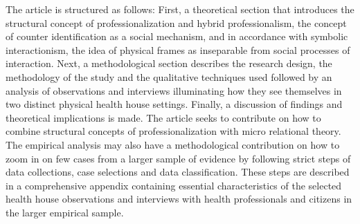 \par
The article is structured as follows: First, a theoretical section that introduces the structural concept of professionalization and hybrid professionalism, the concept of counter identification as a social mechanism, and in accordance with symbolic interactionism, the idea of physical frames as inseparable from social processes of interaction. Next, a methodological section describes the research design, the methodology of the study and the qualitative techniques used followed by an analysis of observations and interviews illuminating how they see themselves in two distinct physical health house settings. Finally, a discussion of findings and theoretical implications is made. The article seeks to contribute on how to combine structural concepts of professionalization with micro relational theory. The empirical analysis may also have a methodological contribution on how to zoom in on few cases from a larger sample of evidence by following strict steps of data collections, case selections and data classification. These steps are described in a comprehensive appendix containing essential characteristics of the selected health house observations and interviews with health professionals and citizens in the larger empirical sample. 

